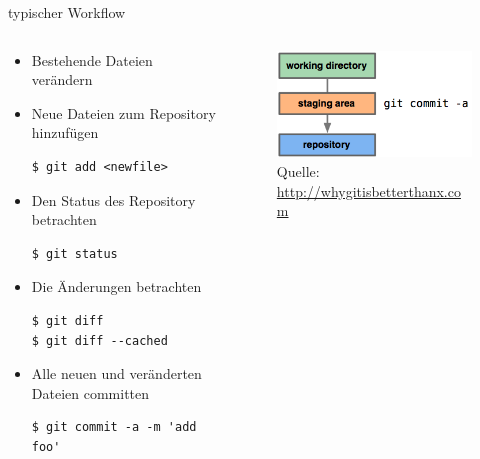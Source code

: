 \begin{frame}[fragile]{typischer Workflow}
  \begin{columns}
    \begin{column}{0.7\textwidth}
      \begin{itemize}
        \item Bestehende Dateien verändern
        \item Neue Dateien zum Repository hinzufügen
        \begin{lstlisting}
$ git add <newfile>
        \end{lstlisting}
        \item Den Status des Repository betrachten
        \begin{lstlisting}
$ git status
        \end{lstlisting}
        \item Die Änderungen betrachten
        \begin{lstlisting}
$ git diff
$ git diff --cached
        \end{lstlisting}
        \item Alle neuen und veränderten Dateien committen
        \begin{lstlisting}
$ git commit -a -m 'add foo'
        \end{lstlisting}
      \end{itemize}
    \end{column}
    \begin{column}{0.35\textwidth}
      \begin{figure}
        \includegraphics[width=\textwidth]{img/commitall}
        \caption[format=empty]{Quelle: \url{http://whygitisbetterthanx.com}}
      \end{figure}
    \end{column}
  \end{columns}
\end{frame}

